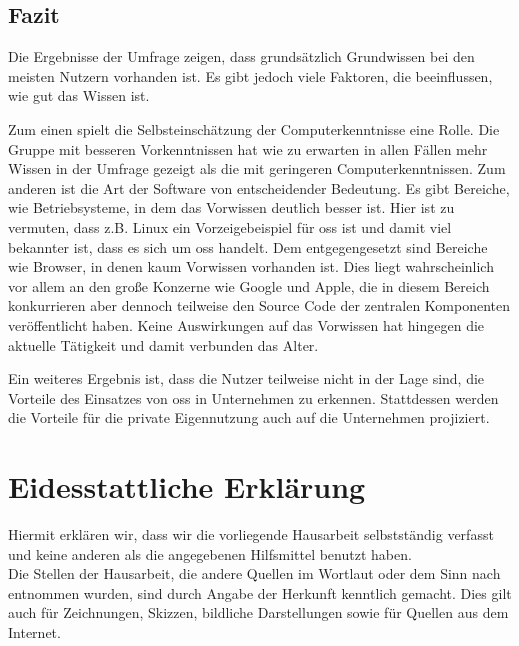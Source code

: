 \documentclass[a4paper]{article}
\begin{document}
        \subsection{Fazit}
            Die Ergebnisse der Umfrage zeigen, dass grundsätzlich Grundwissen bei den meisten Nutzern vorhanden ist. Es gibt jedoch viele Faktoren, die beeinflussen, wie gut das Wissen ist.
            
            Zum einen spielt die Selbsteinschätzung der Computerkenntnisse eine Rolle. Die Gruppe mit besseren Vorkenntnissen hat wie zu erwarten in allen Fällen mehr Wissen in der Umfrage gezeigt als die mit geringeren Computerkenntnissen.
            Zum anderen ist die Art der Software von entscheidender Bedeutung. Es gibt Bereiche, wie Betriebsysteme, in dem das Vorwissen deutlich besser ist. Hier ist zu vermuten, dass z.B. Linux ein Vorzeigebeispiel für \gls{oss} ist und damit viel bekannter ist, dass es sich um \gls{oss} handelt. Dem entgegengesetzt sind Bereiche wie Browser, in denen kaum Vorwissen vorhanden ist. Dies liegt wahrscheinlich vor allem an den große Konzerne wie Google und Apple, die in diesem Bereich konkurrieren aber dennoch teilweise den Source Code der zentralen Komponenten veröffentlicht haben.
            Keine Auswirkungen auf das Vorwissen hat hingegen die aktuelle Tätigkeit und damit verbunden das Alter.
            
            Ein weiteres Ergebnis ist, dass die Nutzer teilweise nicht in der Lage sind, die Vorteile des Einsatzes von \gls{oss} in Unternehmen zu erkennen. Stattdessen werden die Vorteile für die private Eigennutzung auch auf die Unternehmen projiziert.
                
    \clearpage
    \section{Eidesstattliche Erklärung}
        Hiermit erklären wir, dass wir die vorliegende Hausarbeit selbstständig verfasst und keine anderen als die angegebenen Hilfsmittel benutzt haben.\\
        Die Stellen der Hausarbeit, die andere Quellen im Wortlaut oder dem Sinn nach entnommen wurden, sind durch Angabe der Herkunft kenntlich gemacht. Dies gilt auch für Zeichnungen, Skizzen, bildliche Darstellungen sowie für Quellen aus dem Internet.
        
\end{document}
